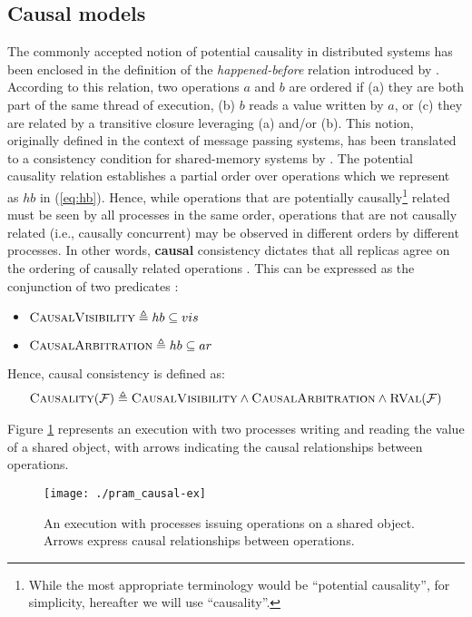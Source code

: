 \documentclass[letter, 11pt]{article}
\newcommand{\RVAL}{\textsc{RVal}(\mathcal{F})}
\newcommand{\citeN}{\citet}
\renewcommand{\cite}{\citep}
\begin{document}
\subsection{Causal models}
\label{subsec:causal}
The commonly accepted notion of potential causality in distributed systems 
has been enclosed in the definition of 
the \emph{happened-before} relation introduced by \citeN{Lamport:78}.
According to this relation, two operations $a$ and $b$ are ordered if 
(a) they are both part of the same thread of execution, (b) $b$ reads a value written by $a$, or
(c) they are related by a transitive closure leveraging (a) and/or (b).
This notion, originally defined in the context of message passing systems, 
has been translated to a consistency condition 
for shared-memory systems by \citeN{Hutto.Ahamad:90}.
The potential causality relation establishes a partial order over operations
which we represent as $hb$ in (\ref{eq:hb}).
Hence, while operations that are potentially causally\footnote{While the most appropriate terminology would 
be ``potential causality'', for simplicity, hereafter we will use ``causality''.}
related must be seen by all processes in the same order, operations that are 
not causally related (i.e., causally concurrent) may be observed in different orders by different processes. 
In other words, \textbf{causal} consistency  
dictates that all replicas agree on the ordering of causally related operations \cite{Hutto.Ahamad:90,Ahamad.Neiger.ea:95,P-Mahajan.Dahlin:11}.
This can be expressed as the conjunction of two predicates \cite{Burckhardt:14}:
\begin{itemize}
\item $\textsc{CausalVisibility} \triangleq hb \subseteq vis$
\item $\textsc{CausalArbitration} \triangleq hb \subseteq ar$
\end{itemize}
Hence, causal consistency is defined as:
\begin{multline}
\textsc{Causality}(\mathcal{F}) \triangleq \textsc{CausalVisibility} \wedge \textsc{CausalArbitration} \wedge \RVAL
\end{multline}

Figure \ref{fig:pram_causal-ex} represents an execution with two processes writing and reading the value
of a shared object, with arrows indicating the causal relationships between operations.
\begin{figure}[h]
	\centering
	\texttt{[image: ./pram\_causal-ex]} 	\caption{An execution with processes issuing operations on a shared object.\\
	Arrows express causal relationships between operations.}
	\label{fig:pram_causal-ex}
\end{figure}
\end{document}
